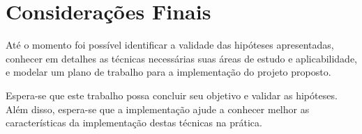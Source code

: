 \chapter{Considerações Finais}

Até o momento foi possível identificar a validade das hipóteses
apresentadas, conhecer em detalhes as técnicas necessárias suas áreas de
estudo e aplicabilidade, e modelar um plano de trabalho para a
implementação do projeto proposto.

Espera-se que este trabalho possa concluir seu objetivo e validar as
hipóteses. Além disso, espera-se que a implementação ajude a conhecer
melhor as características da implementação destas técnicas na prática.
